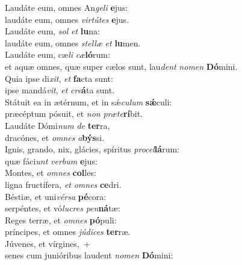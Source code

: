\evenverse Laudáte eum, omnes An\textit{ge}\textit{li} \textbf{e}jus:~\*\\
\evenverse laudáte eum, omnes \textit{vir}\textit{tú}\textit{tes} \textbf{e}jus.\\
\oddverse Laudáte eum, \textit{sol} \textit{et} \textbf{lu}na:~\*\\
\oddverse laudáte eum, omnes \textit{stel}\textit{læ} \textit{et} \textbf{lu}men.\\
\evenverse Laudáte eum, cæ\textit{li} \textit{cæ}\textbf{ló}rum:~\*\\
\evenverse et aquæ omnes, quæ super cælos sunt, lau\textit{dent} \textit{no}\textit{men} \textbf{Dó}mini.\\
\oddverse Quia ipse di\textit{xit}, \textit{et} \textbf{fa}cta sunt:~\*\\
\oddverse ipse mandá\textit{vit}, \textit{et} \textit{cre}\textbf{á}ta sunt.\\
\evenverse Státuit ea in ætérnum, et in sǽ\textit{cu}\textit{lum} \textbf{sǽ}culi:~\*\\
\evenverse præcéptum pósuit, et \textit{non} \textit{præ}\textit{te}\textbf{rí}bit.\\
\oddverse Laudáte Dómi\textit{num} \textit{de} \textbf{ter}ra,~\*\\
\oddverse dracónes, et \textit{om}\textit{nes} \textit{a}\textbf{býs}si.\\
\evenverse Ignis, grando, nix, glácies, spíritus \textit{pro}\textit{cel}\textbf{lá}rum:~\*\\
\evenverse quæ fáci\textit{unt} \textit{ver}\textit{bum} \textbf{e}jus:\\
\oddverse Montes, et \textit{om}\textit{nes} \textbf{col}les:~\*\\
\oddverse ligna fructífera, \textit{et} \textit{om}\textit{nes} \textbf{ce}dri.\\
\evenverse Béstiæ, et uni\textit{vér}\textit{sa} \textbf{pé}cora:~\*\\
\evenverse serpéntes, et vó\textit{lu}\textit{cres} \textit{pen}\textbf{ná}tæ:\\
\oddverse Reges terræ, et \textit{om}\textit{nes} \textbf{pó}puli:~\*\\
\oddverse príncipes, et omnes \textit{jú}\textit{di}\textit{ces} \textbf{ter}ræ.\\
\evenverse Júvenes, et vírgines,~+\\
\evenverse  senes cum junióribus laudent \textit{no}\textit{men} \textbf{Dó}mini:~\*\\
